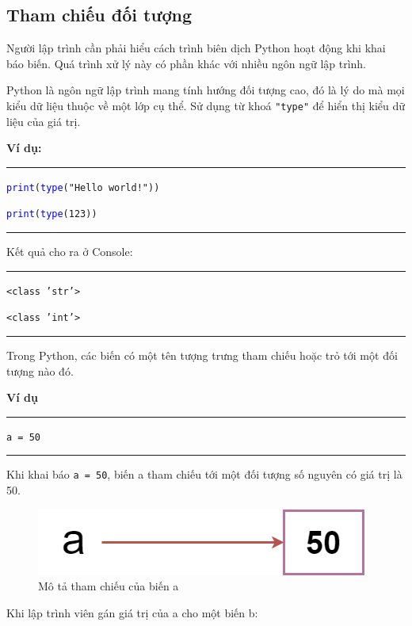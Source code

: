 \subsection{Tham chiếu đối tượng}
Người lập trình cần phải hiểu cách trình biên dịch Python hoạt động khi khai báo biến. Quá trình xử lý này có phần khác với nhiều ngôn ngữ lập trình.\par
Python là ngôn ngữ lập trình mang tính hướng đối tượng cao, đó là lý do mà mọi kiểu dữ liệu thuộc về một lớp cụ thể. Sử dụng từ khoá \texttt{"type"} để hiển thị kiểu dữ liệu của giá trị.\par
\textbf{Ví dụ:}\\
\rule{\linewidth}{0.2mm}\par
\begin{linenumbers}
	\texttt{\textcolor{blue}{print}(\textcolor{blue}{type}("Hello world!"))}\par
	\texttt{\textcolor{blue}{print}(\textcolor{blue}{type}(123))}\par
\end{linenumbers}
\rule{\linewidth}{0.2mm}\par
\noindent
\resetlinenumber
Kết quả cho ra ở Console:\\
\rule{\linewidth}{0.2mm}\par
\begin{linenumbers}
	\texttt{<class 'str'>}\par
	\texttt{<class 'int'>}
\end{linenumbers}
\rule{\linewidth}{0.2mm}\par
\resetlinenumber
Trong Python, các biến có một tên tượng trưng tham chiếu hoặc trỏ tới một đối tượng nào đó.\par
\textbf{Ví dụ}\\
\rule{\linewidth}{0.2mm}\par
	\texttt{a = 50}\\
\rule{\linewidth}{0.2mm}\par
Khi khai báo \texttt{a = 50}, biến a tham chiếu tới một đối tượng số nguyên có giá trị là 50.
\begin{figure}[h]
	\centering
	\includegraphics[width=0.7\linewidth]{img/ref1}
	\caption{Mô tả tham chiếu của biến a}
\end{figure}\par
Khi lập trình viên gán giá trị của a cho một biến b:\\
